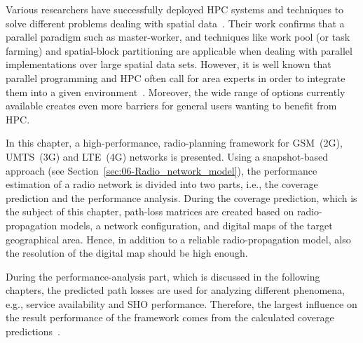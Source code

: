 Various researchers have successfully deployed HPC systems and techniques
to solve different problems dealing with spatial data~\cite{Akhter-GRASS_GIS_on_high_performance_computing_with_MPI_OpenMP_and_Ninf-G:2010,Armstrong_Using_a_computational_grid_for_geographic_information_analysis:2005,Guan_A_parallel_computing_approach_to_fast_geostatistical_areal_interpolation:2011,Huang_Using_adaptively_coupled_models_and_high_performance_computing_for_enabling_the_computability_of_dust_storm_forecasting:2012,Li_Parallel_cellular_automata_for_large_scale_urban_simulation_using_load_balancing_techniques:2010,Osterman_CUDA_on_GRASS:2012,Tabik-High_performance_three_horizon_composition_algorithm_for_large_scale_terrains:2011,Tabik-Optimal_tilt_and_orientation_maps_a_multi_algorithm_approach_for_heterogeneous_multicore_GPU_systems:2013,Tabik_Simultaneous_computation_of_total_viewshed_on_large_high_resolution_grids:2012,Widener_Developing_a_parallel_computational_implementation_of_AMOEBA:2012,Yin_A_framework_for_integrating_GIS_and_parallel_computing_for_spatial_control_problems_a_case_study_of_wildfire_dontrol:2012}.
Their work confirms that a parallel paradigm such as master-worker,
and techniques like work pool (or task farming) and spatial-block
partitioning are applicable when dealing with parallel implementations
over large spatial data sets. However, it is well known that parallel
programming and HPC often call for area experts in order to integrate
them into a given environment~\cite{Clematis_High_performance_computing_with_geographical_data:2003}.
Moreover, the wide range of options currently available creates even
more barriers for general users wanting to benefit from HPC.

\bigskip{}


In this chapter, a high-performance, radio-planning framework for
GSM~(2G), UMTS~(3G) and LTE~(4G) networks is presented. Using a
snapshot-based approach (see Section~\ref{sec:06-Radio_network_model}),
the performance estimation of a radio network is divided into two
parts, i.e., the coverage prediction and the performance analysis.
During the coverage prediction, which is the subject of this chapter,
path-loss matrices are created based on radio-propagation models,
a network configuration, and digital maps of the target geographical
area. Hence, in addition to a reliable radio-propagation model, also
the resolution of the digital map should be high enough.

During the performance-analysis part, which is discussed in the following
chapters, the predicted path losses are used for analyzing different
phenomena, e.g., service availability and SHO performance. Therefore,
the largest influence on the result performance of the framework comes
from the calculated coverage predictions~\cite{Coinchon-The_impact_of_radio_propagation_predictions:2020}.

